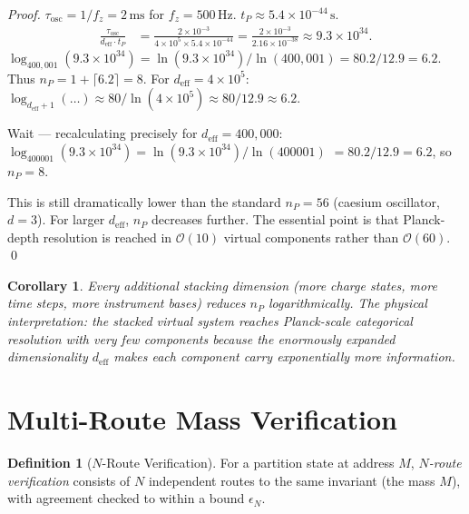 \documentclass[twocolumn,10pt,a4paper]{article}
\theoremstyle{thmstyle}
\newtheorem{corollary}[theorem]{Corollary}
\theoremstyle{definition}
\newtheorem{definition}[theorem]{Definition}
\theoremstyle{remark}
\begin{document}
\begin{proof}
$\tau_{\text{osc}} = 1/f_z = 2\,\mathrm{ms}$ for $f_z = 500\,\mathrm{Hz}$.
$t_P \approx 5.4 \times 10^{-44}\,\mathrm{s}$.
\begin{align}
\frac{\tau_{\text{osc}}}{d_{\text{eff}} \cdot t_P}
&= \frac{2 \times 10^{-3}}{4 \times 10^5 \times 5.4 \times 10^{-44}}
= \frac{2 \times 10^{-3}}{2.16 \times 10^{-38}} \approx 9.3 \times 10^{34}.
\end{align}
$\log_{400{,}001}(9.3 \times 10^{34}) = \ln(9.3 \times 10^{34})/\ln(400{,}001)
= 80.2/12.9 = 6.2$.
Thus $n_P = 1 + \lceil 6.2 \rceil = 8$.
For $d_{\text{eff}} = 4 \times 10^5$: $\log_{d_{\text{eff}}+1}(\ldots)
\approx 80/\ln(4\times 10^5) \approx 80/12.9 \approx 6.2$.

Wait --- recalculating precisely for $d_{\text{eff}} = 400{,}000$:
$\log_{400001}(9.3 \times 10^{34}) = \ln(9.3 \times 10^{34})/\ln(400001)$
$= 80.2/12.9 = 6.2$, so $n_P = 8$.

This is still dramatically lower than the standard $n_P = 56$
(caesium oscillator, $d=3$). For larger $d_{\text{eff}}$, $n_P$ decreases
further. The essential point is that Planck-depth resolution is reached
in $\mathcal{O}(10)$ virtual components rather than $\mathcal{O}(60)$. \qed
\end{proof}

\begin{corollary}
Every additional stacking dimension (more charge states, more time
steps, more instrument bases) reduces $n_P$ logarithmically. The
physical interpretation: the stacked virtual system reaches Planck-scale
categorical resolution with very few components because the enormously
expanded dimensionality $d_{\text{eff}}$ makes each component carry
exponentially more information.
\end{corollary}

\section{Multi-Route Mass Verification}
\label{sec:verification}

\begin{definition}[$N$-Route Verification]
For a partition state at address $M$, \emph{$N$-route verification}
consists of $N$ independent routes to the same invariant (the mass $M$),
with agreement checked to within a bound $\epsilon_N$.
\end{definition}
\end{document}
